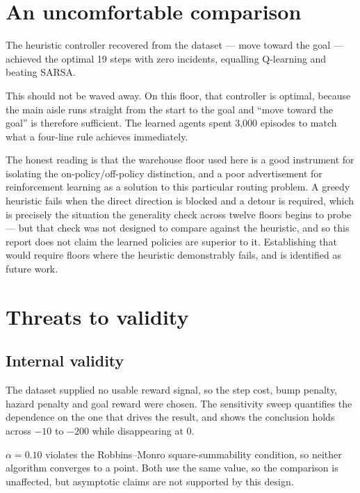 \section{An uncomfortable comparison}

The heuristic controller recovered from the dataset --- move toward the goal --- achieved the
optimal 19 steps with zero incidents, equalling Q-learning and beating SARSA.

This should not be waved away. On this floor, that controller is optimal, because the main aisle
runs straight from the start to the goal and ``move toward the goal'' is therefore sufficient. The
learned agents spent 3{,}000 episodes to match what a four-line rule achieves immediately.

The honest reading is that the warehouse floor used here is a good instrument for isolating the
on-policy/off-policy distinction, and a poor advertisement for reinforcement learning as a
solution to this particular routing problem. A greedy heuristic fails when the direct direction is
blocked and a detour is required, which is precisely the situation the generality check across
twelve floors begins to probe --- but that check was not designed to compare against the heuristic,
and so this report does not claim the learned policies are superior to it. Establishing that would
require floors where the heuristic demonstrably fails, and is identified as future work.

\section{Threats to validity}

\subsection{Internal validity}

 The dataset supplied no usable reward signal, so the
step cost, bump penalty, hazard penalty and goal reward were chosen. The sensitivity sweep
quantifies the dependence on the one that drives the result, and shows the conclusion holds across
$-10$ to $-200$ while disappearing at $0$.

 $\alpha = 0.10$ violates the Robbins--Monro square-summability
condition, so neither algorithm converges to a point. Both use the same value, so the comparison is
unaffected, but asymptotic claims are not supported by this design.

